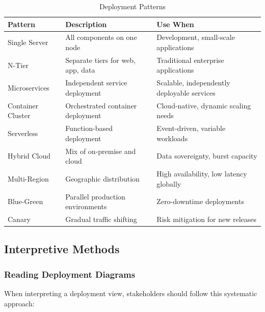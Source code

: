 \documentclass[11pt,letterpaper]{article}
\begin{document}
\begin{table}[H]
\centering
\caption{Deployment Patterns}
\small
\begin{tabular}{@{}L{3cm}L{5cm}L{5.5cm}@{}}
\toprule
\textbf{Pattern} & \textbf{Description} & \textbf{Use When} \\
\midrule
Single Server & All components on one node & Development, small-scale applications \\
\addlinespace
N-Tier & Separate tiers for web, app, data & Traditional enterprise applications \\
\addlinespace
Microservices & Independent service deployment & Scalable, independently deployable services \\
\addlinespace
Container Cluster & Orchestrated container deployment & Cloud-native, dynamic scaling needs \\
\addlinespace
Serverless & Function-based deployment & Event-driven, variable workloads \\
\addlinespace
Hybrid Cloud & Mix of on-premise and cloud & Data sovereignty, burst capacity \\
\addlinespace
Multi-Region & Geographic distribution & High availability, low latency globally \\
\addlinespace
Blue-Green & Parallel production environments & Zero-downtime deployments \\
\addlinespace
Canary & Gradual traffic shifting & Risk mitigation for new releases \\
\bottomrule
\end{tabular}
\end{table}

\subsection{Interpretive Methods}

\subsubsection{Reading Deployment Diagrams}

When interpreting a deployment view, stakeholders should follow this systematic approach:
\end{document}
